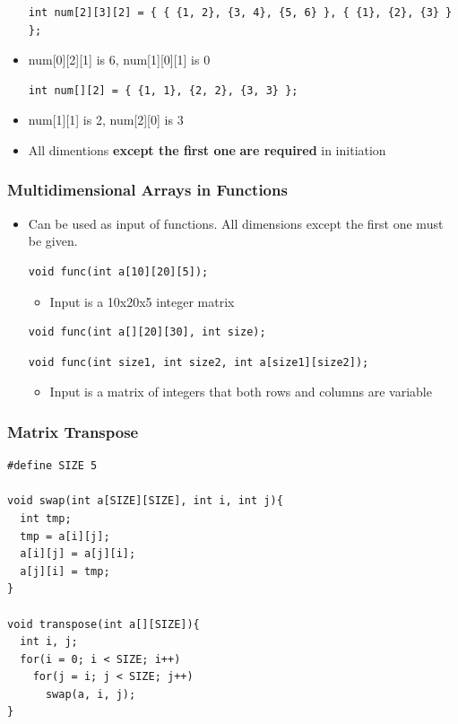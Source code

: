 \documentclass{../c-lecture}
\begin{document}
\begin{frame}[fragile]
  \begin{itemize}
    \begin{verbatim}
int num[2][3][2] = { { {1, 2}, {3, 4}, {5, 6} }, { {1}, {2}, {3} } };
    \end{verbatim}
    \item num[0][2][1] is 6, num[1][0][1] is 0
    \begin{verbatim}
int num[][2] = { {1, 1}, {2, 2}, {3, 3} };
    \end{verbatim}
    \item num[1][1] is 2, num[2][0] is 3
    \item
      All dimentions
      \textbf{\color{Orange} except the first one} \textbf{\color{Yellow} are required} in
      initiation
  \end{itemize}
\end{frame}

\begin{frame}[fragile]
  \frametitle{Multidimensional Arrays in Functions}
  \begin{itemize}
    \item
      Can be used as input of functions. All dimensions except the first one
      {\color{YellowOrange} must} be given.

    \begin{verbatim}
void func(int a[10][20][5]);
    \end{verbatim}
    \begin{itemize}
      \item Input is a 10x20x5 integer matrix
    \end{itemize}
    \begin{verbatim}
void func(int a[][20][30], int size);
    \end{verbatim}
    \begin{verbatim}
void func(int size1, int size2, int a[size1][size2]);
    \end{verbatim}
    \begin{itemize}
      \item
        Input is a matrix of integers that both rows and columns are variable

    \end{itemize}
  \end{itemize}
\end{frame}

\begin{frame}[fragile]
  \frametitle{Matrix Transpose}
  \begin{verbatim}
#define SIZE 5

void swap(int a[SIZE][SIZE], int i, int j){
  int tmp;
  tmp = a[i][j];
  a[i][j] = a[j][i];
  a[j][i] = tmp;
}

void transpose(int a[][SIZE]){
  int i, j;
  for(i = 0; i < SIZE; i++)
    for(j = i; j < SIZE; j++)
      swap(a, i, j);
}
  \end{verbatim}
\end{frame}
\end{document}
